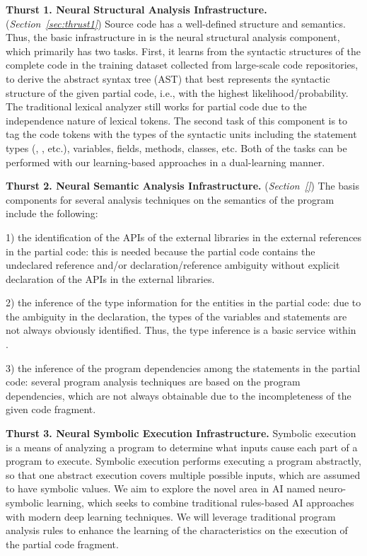 \noindent \textbf{Thurst 1. Neural Structural Analysis Infrastructure.} ({\em Section~\ref{sec:thrust1}}) Source code has a well-defined structure and semantics. Thus, the basic infrastructure in {\tool} is the neural structural analysis component, which primarily has two tasks. First, it learns from the syntactic structures of the complete code in the training dataset collected from large-scale code repositories, to derive the abstract syntax tree (AST) that best represents the syntactic structure of the given partial code, i.e., with the highest likelihood/probability. The traditional lexical analyzer still works for partial code due to the independence nature of lexical tokens. The second task of this component is to tag the code tokens with the types of the syntactic units including the statement types (, , etc.), variables, fields, methods, classes, etc. Both of the tasks can be performed with our learning-based approaches in a dual-learning manner.
  
\vspace{3pt}
\noindent \textbf{Thurst 2. Neural Semantic Analysis Infrastructure.}
({\em Section~\ref{}}) The basis components for several analysis
techniques on the semantics of the program include the following:

1) the identification of the APIs of the external libraries in the
external references in the partial code: this is needed because the
partial code contains the undeclared reference and/or
declaration/reference ambiguity without explicit declaration of the
APIs in the external libraries.

2) the inference of the type information for the entities in the
partial code: due to the ambiguity in the declaration, the types of
the variables and statements are not always obviously
identified. Thus, the type inference is a basic service within
{\tool}.

3) the inference of the program dependencies among the statements in
the partial code: several program analysis techniques are based on the
program dependencies, which are not always obtainable due to the
incompleteness of the given code fragment.

\vspace{3pt}
\noindent \textbf{Thurst 3. Neural Symbolic Execution Infrastructure.}
Symbolic execution is a means of analyzing a program to determine what
inputs cause each part of a program to execute. Symbolic execution
performs executing a program abstractly, so that one abstract
execution covers multiple possible inputs, which are assumed to have
symbolic values. We aim to explore the novel area in AI named
neuro-symbolic learning, which seeks to combine traditional
rules-based AI approaches with modern deep learning techniques.  We
will leverage traditional program analysis rules to enhance the
learning of the characteristics on the execution of the partial code
fragment.

